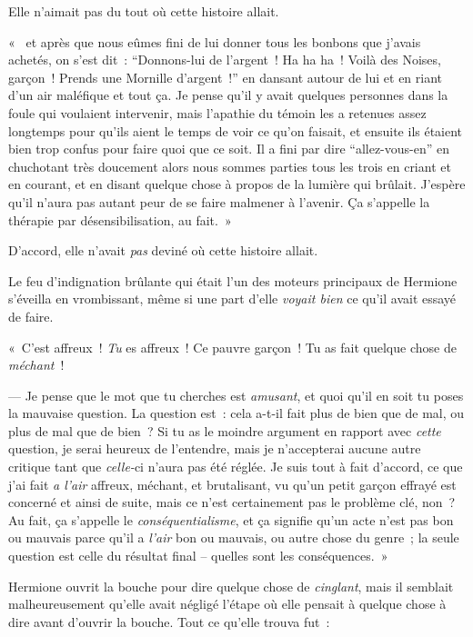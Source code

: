 Elle n'aimait pas du tout où cette histoire allait.

«~ et après que nous eûmes fini de lui donner tous les bonbons que j'avais achetés, on s'est dit~: “Donnons-lui de l'argent~! Ha ha ha~! Voilà des Noises, garçon~! Prends une Mornille d'argent~!” en dansant autour de lui et en riant d'un air maléfique et tout ça. Je pense qu'il y avait quelques personnes dans la foule qui voulaient intervenir, mais l'apathie du témoin les a retenues assez longtemps pour qu'ils aient le temps de voir ce qu'on faisait, et ensuite ils étaient bien trop confus pour faire quoi que ce soit. Il a fini par dire “allez-vous-en” en chuchotant très doucement alors nous sommes parties tous les trois en criant et en courant, et en disant quelque chose à propos de la lumière qui brûlait. J'espère qu'il n'aura pas autant peur de se faire malmener à l'avenir. Ça s'appelle la thérapie par désensibilisation, au fait.~»

D'accord, elle n'avait \emph{pas} deviné où cette histoire allait.

Le feu d'indignation brûlante qui était l'un des moteurs principaux de Hermione s'éveilla en vrombissant, même si une part d'elle \emph{voyait bien} ce qu'il avait essayé de faire.

«~C'est affreux~! \emph{Tu} es affreux~! Ce pauvre garçon~! Tu as fait quelque chose de \emph{méchant}~!

--- Je pense que le mot que tu cherches est \emph{amusant}, et quoi qu'il en soit tu poses la mauvaise question. La question est~: cela a-t-il fait plus de bien que de mal, ou plus de mal que de bien~? Si tu as le moindre argument en rapport avec \emph{cette} question, je serai heureux de l'entendre, mais je n'accepterai aucune autre critique tant que \emph{celle-}ci n'aura pas été réglée. Je suis tout à fait d'accord, ce que j'ai fait \emph{a l'air} affreux, méchant, et brutalisant, vu qu'un petit garçon effrayé est concerné et ainsi de suite, mais ce n'est certainement pas le problème clé, non~? Au fait, ça s'appelle le \emph{conséquentialisme}, et ça signifie qu'un acte n'est pas bon ou mauvais parce qu'il a \emph{l'air} bon ou mauvais, ou autre chose du genre~; la seule question est celle du résultat final -- quelles sont les conséquences.~»

Hermione ouvrit la bouche pour dire quelque chose de \emph{cinglant}, mais il semblait malheureusement qu'elle avait négligé l'étape où elle pensait à quelque chose à dire avant d'ouvrir la bouche. Tout ce qu'elle trouva fut~:

